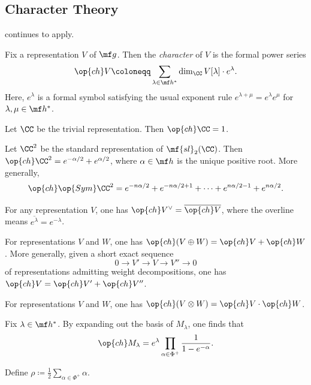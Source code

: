 \documentclass{article}
\begin{document}
\subsection{Character Theory} \label{subsec:char}
\begin{conv}
	 continues to apply.
\end{conv}
\begin{definition}[character]
	Fix a representation $V$ of $\mf g$. Then the \textit{character} of $V$ is the formal power series
	\[\op{ch}V\coloneqq\sum_{\lambda\in\mf h^*}\dim_\CC V[\lambda]\cdot e^\lambda.\]
	Here, $e^\lambda$ is a formal symbol satisfying the usual exponent rule $e^{\lambda+\mu}=e^\lambda e^\mu$ for $\lambda,\mu\in\mf h^*$.
\end{definition}
\begin{example}
	Let $\CC$ be the trivial representation. Then $\op{ch}\CC=1$.
\end{example}
\begin{example}
	Let $\CC^2$ be the standard representation of $\mf{sl}_2(\CC)$. Then $\op{ch}\CC^2=e^{-\alpha/2}+e^{\alpha/2}$, where $\alpha\in\mf h$ is the unique positive root. More generally,
	\[\op{ch}\op{Sym}\CC^2=e^{-n\alpha/2}+e^{-n\alpha/2+1}+\cdots+e^{n\alpha/2-1}+e^{n\alpha/2}.\]
\end{example}
\begin{example}
	For any representation $V$, one has $\op{ch}V^\lor=\overline{\op{ch}V}$, where the overline means $\overline{e^\lambda}=e^{-\lambda}$.
\end{example}
\begin{example}
	For representations $V$ and $W$, one has $\op{ch}(V\oplus W)=\op{ch}V+\op{ch}W$. More generally, given a short exact sequence
	\[0\to V'\to V\to V''\to0\]
	of representations admitting weight decompositions, one has $\op{ch}V=\op{ch}V'+\op{ch}V''$.
\end{example}
\begin{example}
	For representations $V$ and $W$, one has $\op{ch}(V\otimes W)=\op{ch}V\cdot\op{ch}W$.
\end{example}
\begin{example} \label{ex:ch-verma}
	Fix $\lambda\in\mf h^*$. By expanding out the basis of $M_\lambda$, one finds that
	\[\op{ch}M_\lambda=e^\lambda\prod_{\alpha\in\Phi^+}\frac1{1-e^{-\alpha}}.\]
\end{example}
\begin{notation}
	Define $\rho\coloneqq\frac12\sum_{\alpha\in\Phi^+}\alpha$.
\end{notation}
\end{document}
